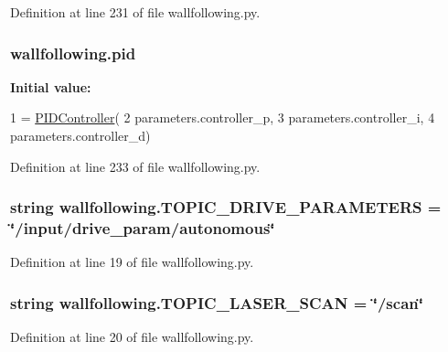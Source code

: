 Definition at line 231 of file wallfollowing.\+py.

\subsubsection[{\texorpdfstring{pid}{pid}}]{\setlength{\rightskip}{0pt plus 5cm}wallfollowing.\+pid}\hypertarget{namespacewallfollowing_adc9f95e0b626be8ddae98a596a38e7e8}{}\label{namespacewallfollowing_adc9f95e0b626be8ddae98a596a38e7e8}
{\bfseries Initial value\+:}
\begin{DoxyCode}
1 = \hyperlink{classwallfollowing_1_1_p_i_d_controller}{PIDController}(
2     parameters.controller\_p,
3     parameters.controller\_i,
4     parameters.controller\_d)
\end{DoxyCode}


Definition at line 233 of file wallfollowing.\+py.

\subsubsection[{\texorpdfstring{T\+O\+P\+I\+C\+\_\+\+D\+R\+I\+V\+E\+\_\+\+P\+A\+R\+A\+M\+E\+T\+E\+RS}{TOPIC_DRIVE_PARAMETERS}}]{\setlength{\rightskip}{0pt plus 5cm}string wallfollowing.\+T\+O\+P\+I\+C\+\_\+\+D\+R\+I\+V\+E\+\_\+\+P\+A\+R\+A\+M\+E\+T\+E\+RS = \char`\"{}/input/drive\+\_\+param/autonomous\char`\"{}}\hypertarget{namespacewallfollowing_a765ce45df7d0c3d9134fc83534029e36}{}\label{namespacewallfollowing_a765ce45df7d0c3d9134fc83534029e36}


Definition at line 19 of file wallfollowing.\+py.

\subsubsection[{\texorpdfstring{T\+O\+P\+I\+C\+\_\+\+L\+A\+S\+E\+R\+\_\+\+S\+C\+AN}{TOPIC_LASER_SCAN}}]{\setlength{\rightskip}{0pt plus 5cm}string wallfollowing.\+T\+O\+P\+I\+C\+\_\+\+L\+A\+S\+E\+R\+\_\+\+S\+C\+AN = \char`\"{}/scan\char`\"{}}\hypertarget{namespacewallfollowing_a7e38e617465ebdfa7ec0576ac63443f8}{}\label{namespacewallfollowing_a7e38e617465ebdfa7ec0576ac63443f8}


Definition at line 20 of file wallfollowing.\+py.

